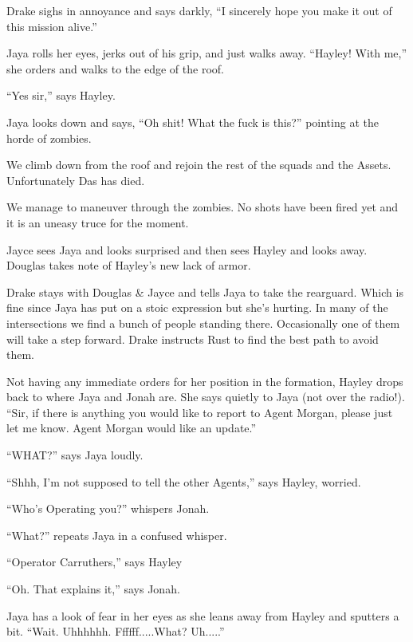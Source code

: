 Drake sighs in annoyance and says darkly,  ``I sincerely hope you make it out of this mission alive.''

Jaya rolls her eyes, jerks out of his grip, and just walks away.  ``Hayley!  With me,'' she orders and walks to the edge of the roof.

``Yes sir,'' says Hayley.

Jaya looks down and says, ``Oh shit!  What the fuck is this?'' pointing at the horde of zombies.



We climb down from the roof and rejoin the rest of the squads and the Assets.  Unfortunately Das has died.

We manage to maneuver through the zombies.  No shots have been fired yet and it is an uneasy truce for the moment.

Jayce sees Jaya and looks surprised and then sees Hayley and looks away.  Douglas takes note of Hayley's new lack of armor.



Drake stays with Douglas \& Jayce and tells Jaya to take the rearguard.  Which is fine since Jaya has put on a stoic expression but she's hurting.  In many of the intersections we find a bunch of people standing there.   Occasionally one of them will take a step forward.  Drake instructs Rust to find the best path to avoid them.

Not having any immediate orders for her position in the formation, Hayley drops back to where Jaya and Jonah are.  She says quietly to Jaya (not over the radio!).  ``Sir, if there is anything you would like to report to Agent Morgan, please just let me know.  Agent Morgan would like an update.''

``WHAT?'' says Jaya loudly.

``Shhh, I'm not supposed to tell the other Agents,'' says Hayley, worried.

``Who's Operating you?'' whispers Jonah.

``What?'' repeats Jaya in a confused whisper.

``Operator Carruthers,'' says Hayley

``Oh.  That explains it,'' says Jonah.

Jaya has a look of fear in her eyes as she leans away from Hayley and sputters a bit. ``Wait.  Uhhhhhh.  Ffffff.....What?  Uh.....''


   {\color[RGB]{255,153,0} } 

